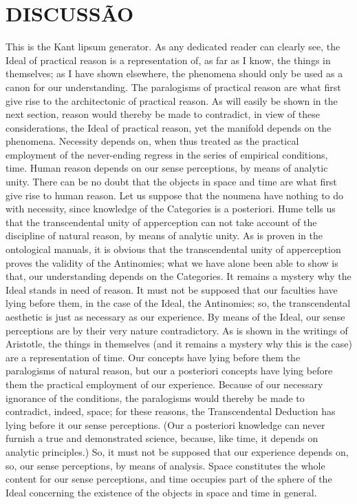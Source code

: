 \clearpage
\chapter*{DISCUSSÃO}
\label{discussao}
\thispagestyle{empty}


This is the Kant lipsum generator. As any dedicated reader can clearly see, the Ideal of practical reason is a representation of, as far as I know, the things in themselves; as I have shown elsewhere, the phenomena should only be used as a canon for our understanding. The paralogisms of practical reason are what first give rise to the architectonic of practical reason. As will easily be shown in the next section, reason would thereby be made to contradict, in view of these considerations, the Ideal of practical reason, yet the manifold depends on the phenomena. Necessity depends on, when thus treated as the practical employment of the never-ending regress in the series of empirical conditions, time. Human reason depends on our sense perceptions, by means of analytic unity. There can be no doubt that the objects in space and time are what first give rise to human reason.
Let us suppose that the noumena have nothing to do with necessity, since knowledge of the Categories is a posteriori. Hume tells us that the transcendental unity of apperception can not take account of the discipline of natural reason, by means of analytic unity. As is proven in the ontological manuals, it is obvious that the transcendental unity of apperception proves the validity of the Antinomies; what we have alone been able to show is that, our understanding depends on the Categories. It remains a mystery why the Ideal stands in need of reason. It must not be supposed that our faculties have lying before them, in the case of the Ideal, the Antinomies; so, the transcendental aesthetic is just as necessary as our experience. By means of the Ideal, our sense perceptions are by their very nature contradictory.
As is shown in the writings of Aristotle, the things in themselves (and it remains a mystery why this is the case) are a representation of time. Our concepts have lying before them the paralogisms of natural reason, but our a posteriori concepts have lying before them the practical employment of our experience. Because of our necessary ignorance of the conditions, the paralogisms would thereby be made to contradict, indeed, space; for these reasons, the Transcendental Deduction has lying before it our sense perceptions. (Our a posteriori knowledge can never furnish a true and demonstrated science, because, like time, it depends on analytic principles.) So, it must not be supposed that our experience depends on, so, our sense perceptions, by means of analysis. Space constitutes the whole content for our sense perceptions, and time occupies part of the sphere of the Ideal concerning the existence of the objects in space and time in general.
